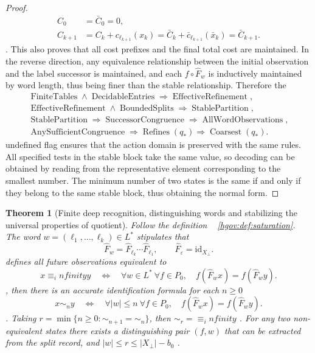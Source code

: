 \documentclass[12pt,a4paper,openany,notitlepage]{report}
\theoremstyle{plain}
\newtheorem{theorem}{Theorem}[chapter]
\theoremstyle{definition}
\theoremstyle{remark}
\def\mathcal#1{#1}\def\mathsf#1{#1}\def\mathbb#1{#1}%
\def\infty{infinity}\def\Gamma{Gamma}\def\Phi{Phi}%
\begin{document}
\begin{CJK*}
\begin{proof}
\[ \begin{aligned}
 C_0&=\bar C_0=0,\\
 C_{k+1}
 &=C_k+c_{\ell_{k+1}}(x_k)
 =\bar C_k+\bar c_{\ell_{k+1}}(\bar x_k)
 =\bar C_{k+1}.
 \end{aligned}
\]. This also proves that all cost prefixes and the final total cost are maintained. In the reverse direction, any equivalence relationship between the initial observation and the label successor is maintained, and each $f\circ\widehat F_w$ is inductively maintained by word length, thus being finer than the stable relationship. Therefore the \[
\begin{gathered}
\operatorname{FiniteTables}\land\operatorname{DecidableEntries}
\Rightarrow\operatorname{EffectiveRefinement},\\
\operatorname{EffectiveRefinement}\land\operatorname{BoundedSplits}
\Rightarrow\operatorname{StablePartition},\\
\operatorname{StablePartition}\Rightarrow\operatorname{SuccessorCongruence}
\Rightarrow\operatorname{AllWordObservations},\\
\operatorname{AnySufficientCongruence}
\Rightarrow\operatorname{Refines}(q_*)
\Rightarrow\operatorname{Coarsest}(q_*).
\end{gathered}
\] undefined flag ensures that the action domain is preserved with the same rules. All specified tests in the stable block take the same value, so decoding can be obtained by reading from the representative element corresponding to the smallest number. The minimum number of two states is the same if and only if they belong to the same stable block, thus obtaining the normal form.\end{proof}


\begin{theorem}
[Finite deep recognition, distinguishing words and stabilizing the universal properties of quotient]\label{exp:gov:future-equivalence}
Follow the definition ~ \ref{hgov:def:saturation}. The word $w=(\ell_1,\ldots,\ell_k)\in L^*$ stipulates that \[
 \widehat F_w=\widehat F_{\ell_k}\cdots\widehat F_{\ell_1},
 \qquad \widehat F_{\varepsilon}=\mathrm{id}_{X_\bot}.
\] defines all future observations equivalent to \[
 x\equiv_\infty y
 \quad\Longleftrightarrow\quad
 \forall w\in L^*\ \forall f\in\mathcal P_0,
 \quad f(\widehat F_wx)=f(\widehat F_wy).
\], then there is an accurate identification formula for each $n\ge0$ \[
 x\sim_ny
 \quad\Longleftrightarrow\quad
 \forall |w|\le n\ \forall f\in\mathcal P_0,
 \quad f(\widehat F_wx)=f(\widehat F_wy).
\]. Taking $r=\min\{n\ge0:\sim_{n+1}=\sim_n\}$, then $\sim_r=\equiv_\infty$ . For any two non-equivalent states there exists a distinguishing pair $(f,w)$ that can be extracted from the split record, and $|w|\le r\le |X_\bot|-b_0$ .


\end{theorem}
\end{CJK*}
\end{document}

